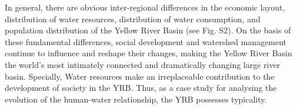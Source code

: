 \documentclass[9pt,twoside,lineno]{pnas-new}
\begin{document}
In general, there are obvious inter-regional differences in the economic layout, distribution of water resources, distribution of water consumption, and population distribution of the Yellow River Basin (see Fig. S2).
On the basis of these fundamental differences, social development and watershed management continue to influence and reshape their changes, making the Yellow River Basin the world's most intimately connected and dramatically changing large river basin.
Specially, Water resources make an irreplaceable contribution to the development of society in the YRB.
Thus, as a case study for analysing the evolution of the human-water relationship, the YRB possesses typicality.


\end{document}
